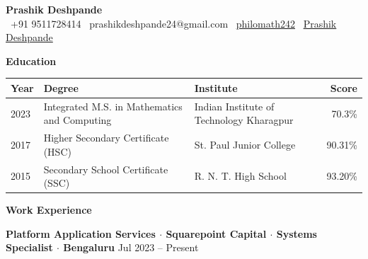 \documentclass[10pt,a4paper]{article}
\newcommand{\customsection}[1]{%
    \vspace{0.5em}
    \noindent\colorbox{sectionblue}{\parbox{\dimexpr\textwidth-2\fboxsep}{%
        \vspace{0.14em}\centering\textbf{\fontsize{10}{12}\selectfont #1}\vspace{0.14em}%
    }}
    \vspace{0.4em}
}
\begin{document}
\begin{center}
    \textbf{\fontsize{14}{16}\selectfont Prashik Deshpande}\\[0.5ex]
    \footnotesize
    \faPhone\ +91 9511728414 \quad
    \faEnvelope\ prashikdeshpande24@gmail.com \quad
    \faGithub\ \href{https://github.com/philomath242}{philomath242} \quad
    \faLinkedin\ \href{https://linkedin.com/in/prashikdeshpande}{Prashik Deshpande}
\end{center}

\vspace{0.7em}

\customsection{Education}
\begin{tabular}{@{} l @{\quad} l @{\quad\quad} >{\raggedright\arraybackslash}p{} @{\quad\quad} r @{}}
\toprule
\textbf{Year} & \textbf{Degree} & \textbf{Institute} & \textbf{Score} \\
\midrule
2023 & Integrated M.S. in Mathematics and Computing 
     & Indian Institute of Technology Kharagpur & 70.3\% \\
2017 & Higher Secondary Certificate (HSC)
     & St. Paul Junior College & 90.31\% \\
2015 & Secondary School Certificate (SSC)
     & R. N. T. High School & 93.20\% \\
\bottomrule
\end{tabular}

\vspace{0.7em}
\customsection{Work Experience}

\noindent\textbf{Platform Application Services $\cdot$ Squarepoint Capital $\cdot$ Systems Specialist $\cdot$ Bengaluru} \hfill Jul 2023 -- Present
\end{document}
